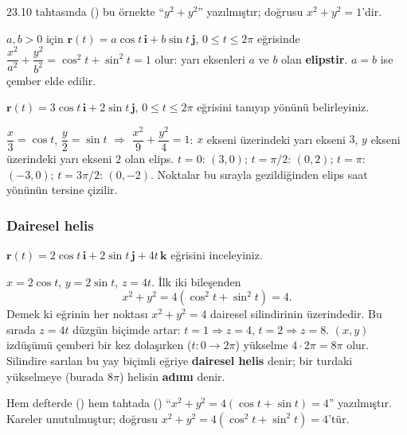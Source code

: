 \begin{bilgi}
23.10 tahtasında () bu örnekte ``$y^2+y^2$'' yazılmıştır; doğrusu $x^2+y^2=1$'dir.
\end{bilgi}

\begin{bilgi}
$a,b>0$ için $\mathbf r(t)=a\cos t\,\mathbf i+b\sin t\,\mathbf j$, $0\le t\le 2\pi$ eğrisinde
$\dfrac{x^2}{a^2}+\dfrac{y^2}{b^2}=\cos^2t+\sin^2t=1$ olur: yarı eksenleri $a$ ve $b$ olan \textbf{elipstir}. $a=b$ ise çember elde edilir.
\end{bilgi}

\begin{soru}
$\mathbf r(t)=3\cos t\,\mathbf i+2\sin t\,\mathbf j$, $0\le t\le2\pi$ eğrisini tanıyıp yönünü belirleyiniz.
\end{soru}
\begin{cevap}
$\dfrac{x}{3}=\cos t$, $\dfrac y2=\sin t$ $\Rightarrow$ $\dfrac{x^2}{9}+\dfrac{y^2}{4}=1$: $x$ ekseni üzerindeki yarı ekseni $3$,
$y$ ekseni üzerindeki yarı ekseni $2$ olan elips. $t=0$: $(3,0)$; $t=\pi/2$: $(0,2)$; $t=\pi$: $(-3,0)$; $t=3\pi/2$: $(0,-2)$.
Noktalar bu sırayla gezildiğinden elips saat yönünün tersine çizilir.
\end{cevap}

\subsubsection{Dairesel helis}

\begin{soru}
$\mathbf r(t)=2\cos t\,\mathbf i+2\sin t\,\mathbf j+4t\,\mathbf k$ eğrisini inceleyiniz.
\end{soru}
\begin{cevap}
$x=2\cos t$, $y=2\sin t$, $z=4t$. İlk iki bileşenden
\[ x^2+y^2=4(\cos^2t+\sin^2t)=4 . \]
Demek ki eğrinin her noktası $x^2+y^2=4$ dairesel silindirinin üzerindedir. Bu sırada $z=4t$ düzgün biçimde artar:
$t=1\Rightarrow z=4$, $t=2\Rightarrow z=8$. $(x,y)$ izdüşümü çemberi bir kez dolaşırken ($t:0\to2\pi$) yükselme
$4\cdot2\pi=8\pi$ olur. Silindire sarılan bu yay biçimli eğriye \textbf{dairesel helis} denir; bir turdaki yükselmeye
(burada $8\pi$) helisin \textbf{adımı} denir.
\end{cevap}

\begin{bilgi}
Hem defterde () hem tahtada () ``$x^2+y^2=4(\cos t+\sin t)=4$''
yazılmıştır. Kareler unutulmuştur; doğrusu $x^2+y^2=4(\cos^2t+\sin^2t)=4$'tür.
\end{bilgi}

